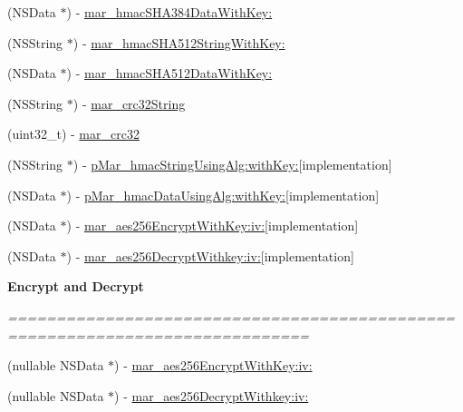 \begin{DoxyCompactItemize}
\item 
(N\+S\+Data $\ast$) -\/ \hyperlink{category_n_s_data_07_m_a_r_e_x_08_ab43e4097394901dc7b3e9559758c8463}{mar\+\_\+hmac\+S\+H\+A384\+Data\+With\+Key\+:}
\item 
(N\+S\+String $\ast$) -\/ \hyperlink{category_n_s_data_07_m_a_r_e_x_08_adecf74c0fc38f4bf3d925fcb5f8b18d7}{mar\+\_\+hmac\+S\+H\+A512\+String\+With\+Key\+:}
\item 
(N\+S\+Data $\ast$) -\/ \hyperlink{category_n_s_data_07_m_a_r_e_x_08_ad52d40f5420c0d16e76b2b01be5afd44}{mar\+\_\+hmac\+S\+H\+A512\+Data\+With\+Key\+:}
\item 
(N\+S\+String $\ast$) -\/ \hyperlink{category_n_s_data_07_m_a_r_e_x_08_ab269ff5201b998501b3a9fb5e1786d22}{mar\+\_\+crc32\+String}
\item 
(uint32\+\_\+t) -\/ \hyperlink{category_n_s_data_07_m_a_r_e_x_08_aae0068b0e14781bf7496e16894d2ceb2}{mar\+\_\+crc32}
\item 
(N\+S\+String $\ast$) -\/ \hyperlink{category_n_s_data_07_m_a_r_e_x_08_afd229151be0a700e48125efc2e7eb34c}{p\+Mar\+\_\+hmac\+String\+Using\+Alg\+:with\+Key\+:}{\ttfamily  \mbox{[}implementation\mbox{]}}
\item 
(N\+S\+Data $\ast$) -\/ \hyperlink{category_n_s_data_07_m_a_r_e_x_08_a8f37f0cd2bff0fd53201d3bdec3856a4}{p\+Mar\+\_\+hmac\+Data\+Using\+Alg\+:with\+Key\+:}{\ttfamily  \mbox{[}implementation\mbox{]}}
\item 
(N\+S\+Data $\ast$) -\/ \hyperlink{category_n_s_data_07_m_a_r_e_x_08_a35eb2bf9db66880cf4f2200d4b3605bc}{mar\+\_\+aes256\+Encrypt\+With\+Key\+:iv\+:}{\ttfamily  \mbox{[}implementation\mbox{]}}
\item 
(N\+S\+Data $\ast$) -\/ \hyperlink{category_n_s_data_07_m_a_r_e_x_08_a0f1f07861aa1c9b087872118b1bae4bd}{mar\+\_\+aes256\+Decrypt\+Withkey\+:iv\+:}{\ttfamily  \mbox{[}implementation\mbox{]}}
\end{DoxyCompactItemize}
\begin{Indent}\textbf{ Encrypt and Decrypt}\par
{\em ============================================================================= 

 }\begin{DoxyCompactItemize}
\item 
(nullable N\+S\+Data $\ast$) -\/ \hyperlink{category_n_s_data_07_m_a_r_e_x_08_a10ef14946872abbaa078d6c64d93cc85}{mar\+\_\+aes256\+Encrypt\+With\+Key\+:iv\+:}
\item 
(nullable N\+S\+Data $\ast$) -\/ \hyperlink{category_n_s_data_07_m_a_r_e_x_08_a59e274308fa0837275615c3aa0d5d5bd}{mar\+\_\+aes256\+Decrypt\+Withkey\+:iv\+:}
\end{DoxyCompactItemize}
\end{Indent}
